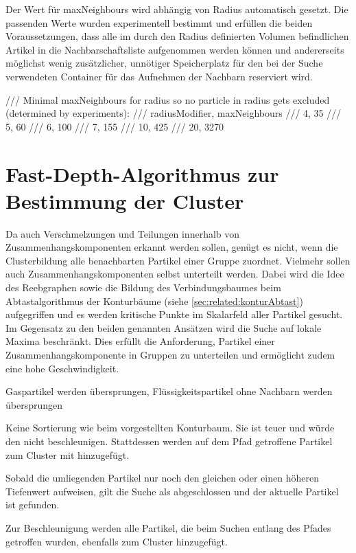 Der Wert für maxNeighbours wird abhängig von Radius automatisch gesetzt. Die passenden Werte wurden experimentell bestimmt und erfüllen die beiden Voraussetzungen, dass alle im durch den Radius definierten Volumen befindlichen Artikel in die Nachbarschaftsliste aufgenommen werden können und andererseits möglichst wenig zusätzlicher, unnötiger Speicherplatz für den bei der Suche verwendeten Container für das Aufnehmen der Nachbarn reserviert wird. %

	/// Minimal maxNeighbours for radius so no particle in radius gets excluded (determined by experiments):
	/// radiusModifier, maxNeighbours
	/// 4, 35
	/// 5, 60
	/// 6, 100
	/// 7, 155
	/// 10, 425
	/// 20, 3270


\section{Fast-Depth-Algorithmus zur Bestimmung der Cluster}\label{sec:fast-depth}

Da auch Verschmelzungen und Teilungen innerhalb von Zusammenhangskomponenten erkannt werden sollen, genügt es nicht, wenn die Clusterbildung alle benachbarten Partikel einer Gruppe zuordnet. Vielmehr sollen auch Zusammenhangskomponenten selbst unterteilt werden.
Dabei wird die Idee des Reebgraphen sowie die Bildung des Verbindungsbaumes beim Abtastalgorithmus der Konturbäume (siehe \autoref{sec:related:konturAbtast}) aufgegriffen und es werden kritische Punkte im Skalarfeld aller Partikel gesucht. Im Gegensatz zu den beiden genannten Ansätzen wird die Suche auf lokale Maxima beschränkt. Dies erfüllt die Anforderung, Partikel einer Zusammenhangskomponente in Gruppen zu unterteilen und ermöglicht zudem eine hohe Geschwindigkeit.

Gaspartikel werden übersprungen, Flüssigkeitspartikel ohne Nachbarn werden übersprungen

Keine Sortierung wie beim vorgestellten Konturbaum. Sie ist teuer und würde den  nicht beschleunigen. Stattdessen werden auf dem Pfad getroffene Partikel zum Cluster mit hinzugefügt.

Sobald die umliegenden Partikel nur noch den gleichen oder einen höheren Tiefenwert aufweisen, gilt die Suche als abgeschlossen und der aktuelle Partikel ist gefunden.


Zur Beschleunigung werden alle Partikel, die beim Suchen entlang des Pfades getroffen wurden, ebenfalls zum Cluster hinzugefügt.

